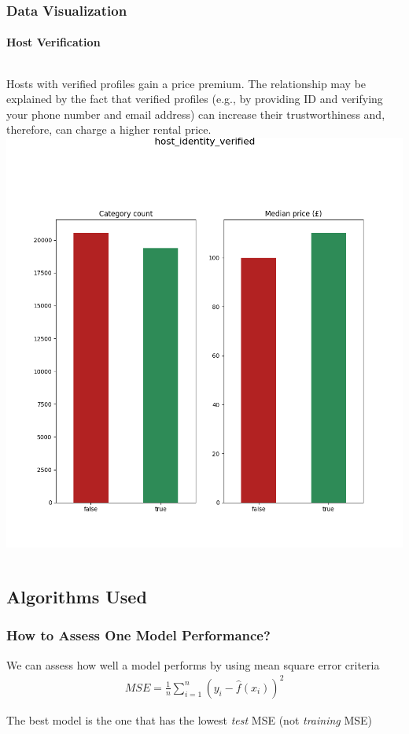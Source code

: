 \documentclass{beamer}
\begin{document}
\begin{frame}
  \frametitle{Data Visualization}
  \framesubtitle{Host Verification}
  \begin{columns}
Hosts with verified profiles gain a price premium. The relationship may be
explained by the fact that verified profiles (e.g., by providing ID and
verifying your phone number and email address) can increase their
trustworthiness and, therefore, can charge a higher rental price.
        \includegraphics[width=\textwidth]{figures/Figure_16_host_identity_verified.png}
  \end{columns}
\end{frame}

\subsection{Algorithms Used}

\begin{frame}
  \frametitle{How to Assess One Model Performance?}
We can assess how well a model performs by using mean square error criteria
\begin{eqnarray}
    \label{eqn:mse}
    MSE = \frac{1}{n} \sum_{i=1}^{n}(y_i - \hat{f}(x_i))^2
\end{eqnarray}

The best model is the one that has the lowest \textit{test} MSE (not
\textit{training} MSE)
\end{frame}
\end{document}
